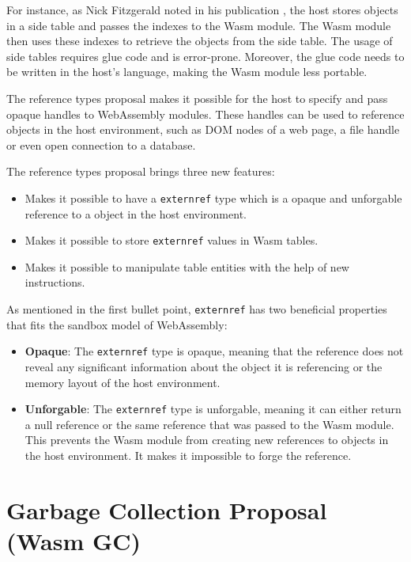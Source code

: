For instance, as Nick Fitzgerald noted in his publication \cite{fitzgerald_2020_webassembly}, the host stores objects in a side table and passes the indexes to the Wasm module. The Wasm module then uses these indexes to retrieve the objects from the side table. The usage of side tables requires glue code and is error-prone. Moreover, the glue code needs to be written in the host's language, making the Wasm module less portable.

The reference types proposal makes it possible for the host to specify and pass opaque handles to WebAssembly modules. These handles can be used to reference objects in the host environment, such as DOM nodes of a web page, a file handle or even open connection to a database. 

The reference types proposal brings three new features:
\begin{itemize}
    \item Makes it possible to have a \texttt{externref} type which is a opaque and unforgable reference to a object in the host environment.
    \item Makes it possible to store \texttt{externref} values in Wasm tables.
    \item Makes it possible to manipulate table entities with the help of new instructions.
\end{itemize}

As mentioned in the first bullet point, \texttt{externref} has two beneficial properties that fits the sandbox model of WebAssembly:
\begin{itemize}
    \item \textbf{Opaque}: The \texttt{externref} type is opaque, meaning that the reference does not reveal any significant information about the object it is referencing or the memory layout of the host environment.
    \item \textbf{Unforgable}: The \texttt{externref} type is unforgable, meaning it can either return a null reference or the same reference that was passed to the Wasm module. This prevents the Wasm module from creating new references to objects in the host environment. It makes it impossible to forge the reference. 
\end{itemize}


\section{Garbage Collection Proposal (Wasm GC)}
\label{sec:gc-proposals}

